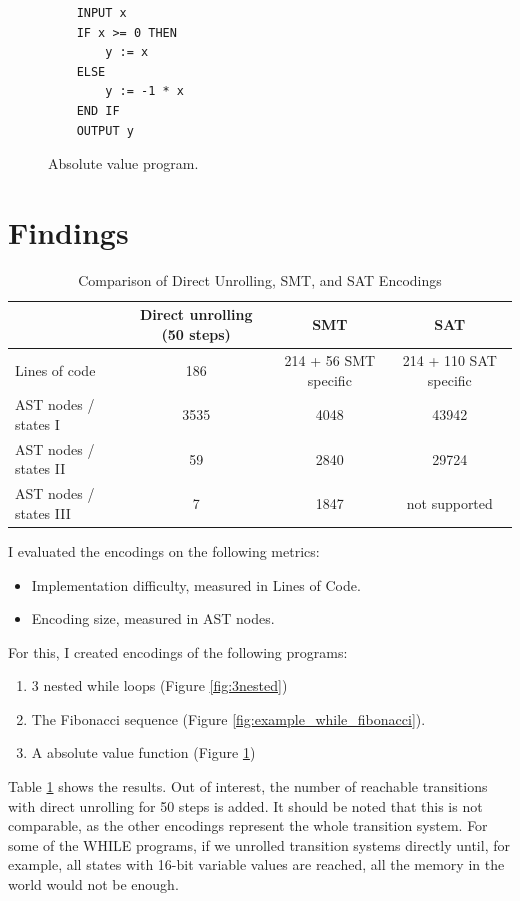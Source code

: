 \documentclass[sigconf,natbib=false]{acmart}
\begin{document}
\begin{figure}
    \centering
    \begin{verbatim}
    INPUT x
    IF x >= 0 THEN
        y := x
    ELSE
        y := -1 * x
    END IF
    OUTPUT y
    \end{verbatim}
    \caption{Absolute value program.}
    \label{fig:abs_value}
\end{figure}


\section{Findings}
\begin{table}
    \centering
    \caption{Comparison of Direct Unrolling, SMT, and SAT Encodings}
    \label{table}
    \begin{tabular}{|l|c|c|c|}
        \hline
        & Direct unrolling (50 steps) & SMT & SAT \\
        \hline
        Lines of code & 186 & 214 + 56 SMT specific & 214 + 110 SAT specific \\
        AST nodes / states I & 3535 & 4048 & 43942 \\
        AST nodes / states II & 59 & 2840 & 29724 \\
        AST nodes / states III & 7 & 1847 & not supported \\
        \hline
    \end{tabular}
\end{table}
I evaluated the encodings on the following metrics:
\begin{itemize}
    \item Implementation difficulty, measured in Lines of Code.
    \item Encoding size, measured in AST nodes.
\end{itemize}

For this, I created encodings of the following programs:
\begin{enumerate}[I]
    \item 3 nested while loops (Figure \ref{fig:3nested})
    \item The Fibonacci sequence (Figure \ref{fig:example_while_fibonacci}).
    \item A absolute value function (Figure \ref{fig:abs_value})
\end{enumerate}


Table \ref{table} shows the results. Out of interest, the number of reachable transitions with direct unrolling for 50 steps is added. It should be noted that this is not comparable, as the other encodings represent the whole transition system. For some of the WHILE programs, if we unrolled transition systems directly until, for example, all states with 16-bit variable values are reached, all the memory in the world would not be enough.
\end{document}
